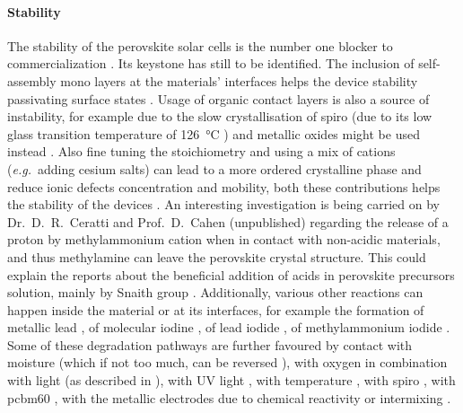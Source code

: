 	\paragraph{Stability}\label{intro_stability}
	The stability of the perovskite solar cells is the number one blocker to commercialization \cite{Reyna2018}.
	Its keystone has still to be identified.
	The inclusion of self\hyp{}assembly mono layers at the materials' interfaces helps the device stability passivating surface states \cite{Lira-Cantu2017,Mingorance2018}.
	Usage of organic contact layers is also a source of instability, for example due to the slow crystallisation of \gls{spiro} \cite{Malinauskas2015} (due to its low glass transition temperature of \SI{126}{\celsius} \cite{Malinauskas2016}) and metallic oxides might be used instead \cite{Mingorance2018}.
	Also fine tuning the stoichiometry and using a mix of cations (\textsl{e.g.}\ adding cesium salts) can lead to a more ordered crystalline phase and reduce ionic defects concentration and mobility, both these contributions helps the stability of the devices \cite{Reyna2018}.
	An interesting investigation is being carried on by Dr.\ D.\ R.\ Ceratti and Prof.\ D.\ Cahen (unpublished) regarding the release of a proton by methylammonium cation when in contact with non-acidic materials, and thus methylamine can leave the perovskite crystal structure.
	This could explain the reports about the beneficial addition of acids in perovskite precursors solution, mainly by Snaith group \cite{Noel2017,Zhang2015a,Nayak2016}.
	Additionally, various other reactions can happen inside the material or at its interfaces, for example the formation of metallic lead \cite{Birkhold2018a,Sadoughi2015}, of molecular iodine \cite{Minns2017}, of lead iodide \cite{Buin2015,Walsh2015}, of methylammonium iodide \cite{Walsh2015}.
Some of these degradation pathways are further favoured by contact with moisture \cite{Jong2018,Schlipf2019,Hu2017,Han2015a} (which if not too much, can be reversed \cite{Leguy2015}), with oxygen in combination with light \cite{Senocrate2018a,Aristidou2017} (as described in ), with UV light \cite{Lee2016}, with temperature \cite{Philippe2015,Conings2015}, with \gls{spiro} \cite{Carrillo2016,Kim2017,Kim2016a}, with \gls{pcbm60} \cite{DeBastiani2016}, with the metallic electrodes due to chemical reactivity \cite{Kato2015,Guerrero2016a,Back2016,Zhao2016,DeBastiani2016} or intermixing \cite{Domanski2016}.


